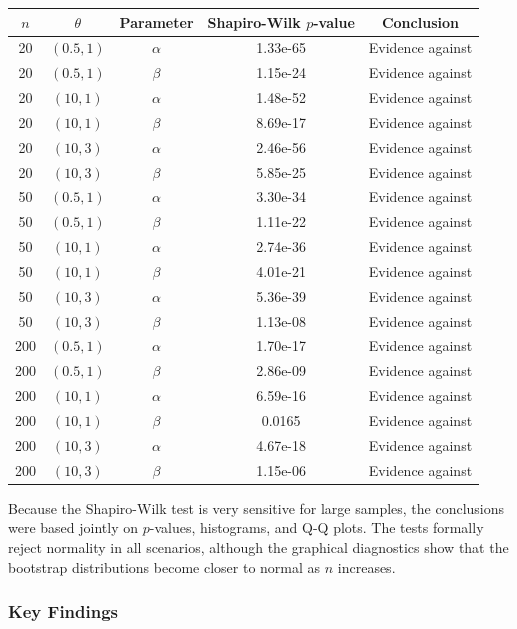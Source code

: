 \documentclass[12pt, a4paper]{article}\usepackage[]{graphicx}\usepackage[]{xcolor}
\begin{document}
\begin{center}
\small
\begin{tabular}{ccccc}
\hline
$n$ & $\theta$ & Parameter & Shapiro-Wilk $p$-value & Conclusion \\
\hline
20 & $(0.5,1)$ & $\alpha$ & 1.33e-65 & Evidence against \\
20 & $(0.5,1)$ & $\beta$ & 1.15e-24 & Evidence against \\
20 & $(10,1)$ & $\alpha$ & 1.48e-52 & Evidence against \\
20 & $(10,1)$ & $\beta$ & 8.69e-17 & Evidence against \\
20 & $(10,3)$ & $\alpha$ & 2.46e-56 & Evidence against \\
20 & $(10,3)$ & $\beta$ & 5.85e-25 & Evidence against \\
50 & $(0.5,1)$ & $\alpha$ & 3.30e-34 & Evidence against \\
50 & $(0.5,1)$ & $\beta$ & 1.11e-22 & Evidence against \\
50 & $(10,1)$ & $\alpha$ & 2.74e-36 & Evidence against \\
50 & $(10,1)$ & $\beta$ & 4.01e-21 & Evidence against \\
50 & $(10,3)$ & $\alpha$ & 5.36e-39 & Evidence against \\
50 & $(10,3)$ & $\beta$ & 1.13e-08 & Evidence against \\
200 & $(0.5,1)$ & $\alpha$ & 1.70e-17 & Evidence against \\
200 & $(0.5,1)$ & $\beta$ & 2.86e-09 & Evidence against \\
200 & $(10,1)$ & $\alpha$ & 6.59e-16 & Evidence against \\
200 & $(10,1)$ & $\beta$ & 0.0165 & Evidence against \\
200 & $(10,3)$ & $\alpha$ & 4.67e-18 & Evidence against \\
200 & $(10,3)$ & $\beta$ & 1.15e-06 & Evidence against \\
\hline
\end{tabular}
\end{center}


Because the Shapiro-Wilk test is very sensitive for large samples, the conclusions were based jointly on $p$-values, histograms, and Q-Q plots. The tests formally reject normality in all scenarios, although the graphical diagnostics show that the bootstrap distributions become closer to normal as $n$ increases.

\subsubsection{Key Findings}
\end{document}
